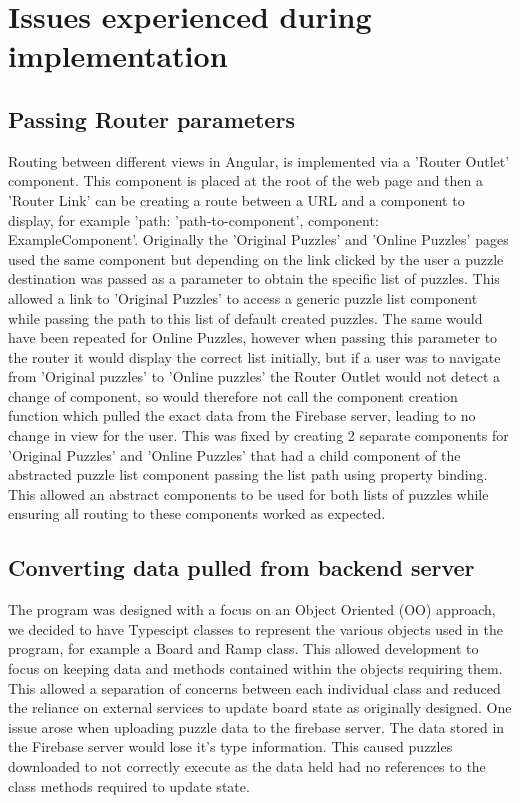 \documentclass{l4proj}
\begin{document}
\section{Issues experienced during implementation}
\subsection{Passing Router parameters}
Routing between different views in Angular, is implemented via a 'Router Outlet' component. This component is placed at the root of the web page and then a 'Router Link' can be creating a route between a URL and a component to display, for example '{path: 'path-to-component', component: ExampleComponent}'. Originally the 'Original Puzzles' and 'Online Puzzles' pages used the same component but depending on the link clicked by the user a puzzle destination was passed as a parameter to obtain the specific list of puzzles. This allowed a link to 'Original Puzzles' to access a generic puzzle list component while passing the path to this list of default created puzzles. The same would have been repeated for Online Puzzles, however when passing this parameter to the router it would display the correct list initially, but if a user was to navigate from 'Original puzzles' to 'Online puzzles' the Router Outlet would not detect a change of component, so would therefore not call the component creation function which pulled the exact data from the Firebase server, leading to no change in view for the user. This was fixed by creating 2 separate components for 'Original Puzzles' and 'Online Puzzles' that had a child component of the abstracted puzzle list component passing the list path using property binding. This allowed an abstract components to be used for both lists of puzzles while ensuring all routing to these components worked as expected.  

\subsection{Converting data pulled from backend server}

The program was designed with a focus on an Object Oriented (OO) approach, we decided to have Typescipt classes to represent the various objects used in the program, for example a Board and Ramp class. This allowed development to focus on keeping data and methods contained within the objects requiring them. This allowed a separation of concerns between each individual class and reduced the reliance on external services to update board state as originally designed. One issue arose when uploading puzzle data to the firebase server. The data stored in the Firebase server would lose it's type information. This caused puzzles downloaded to not correctly execute as the data held had no references to the class methods required to update state. 
\end{document}
